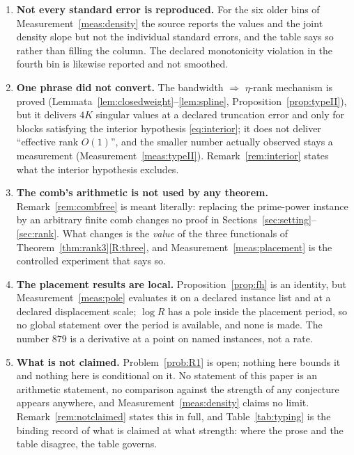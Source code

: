 \documentclass[11pt,a4paper]{article}
\theoremstyle{plain}
\theoremstyle{definition}
\begin{document}
\begin{enumerate}[label=\textup{(L\arabic*)},leftmargin=3.2em]
  binned exponent of Definition~\ref{def:ratio} shifts by up to $0.20$ between
  the declared rung ladder and its coarse sub-ladder, because $\log R$ is
  curved in $\log h$ (measured per-anchor curvature $-0.0842\pm0.0085$). Every
  value in Measurement~\ref{meas:density} is quoted with its rung ladder, and a
  value quoted without one is not reproducible. A ladder-robust estimator ---
  integrating the curvature rather than sampling it --- is not attempted here.
\item\label{L:errors} \textbf{Not every standard error is reproduced.} For the
  six older bins of Measurement~\ref{meas:density} the source reports the
  values and the joint density slope but not the individual standard errors,
  and the table says so rather than filling the column. The declared
  monotonicity violation in the fourth bin is likewise reported and not
  smoothed.
\item\label{L:D4} \textbf{One phrase did not convert.} The bandwidth
  $\Rightarrow$ $\eta$-rank mechanism is proved
  (Lemmata~\ref{lem:closedweight}--\ref{lem:spline},
  Proposition~\ref{prop:typeII}), but it delivers $4K$ singular values at a
  declared truncation error and only for blocks satisfying the interior
  hypothesis \eqref{eq:interior}; it does not deliver ``effective rank $O(1)$'',
  and the smaller number actually observed stays a measurement
  (Measurement~\ref{meas:typeII}). Remark~\ref{rem:interior} states what the
  interior hypothesis excludes.
\item\label{L:arith} \textbf{The comb's arithmetic is not used by any
  theorem.} Remark~\ref{rem:combfree} is meant literally: replacing the
  prime-power instance by an arbitrary finite comb changes no proof in
  Sections~\ref{sec:setting}--\ref{sec:rank}. What changes is the \emph{value}
  of the three functionals of Theorem~\ref{thm:rank3}\ref{R:three}, and
  Measurement~\ref{meas:placement} is the controlled experiment that says so.
\item\label{L:placement} \textbf{The placement results are local.}
  Proposition~\ref{prop:fh} is an identity, but
  Measurement~\ref{meas:pole} evaluates it on a declared instance list and at a
  declared displacement scale; $\log R$ has a pole inside the placement period,
  so no global statement over the period is available, and none is made. The
  number $879$ is a derivative at a point on named instances, not a rate.
\item\label{L:scope} \textbf{What is not claimed.} Problem~\ref{prob:R1} is
  open; nothing here bounds it and nothing here is conditional on it. No
  statement of this paper is an arithmetic statement, no comparison against the
  strength of any conjecture appears anywhere, and
  Measurement~\ref{meas:density} claims no limit.
  Remark~\ref{rem:notclaimed} states this in full, and
  Table~\ref{tab:typing} is the binding record of what is claimed at what
  strength: where the prose and the table disagree, the table governs.
\end{enumerate}
\end{document}
